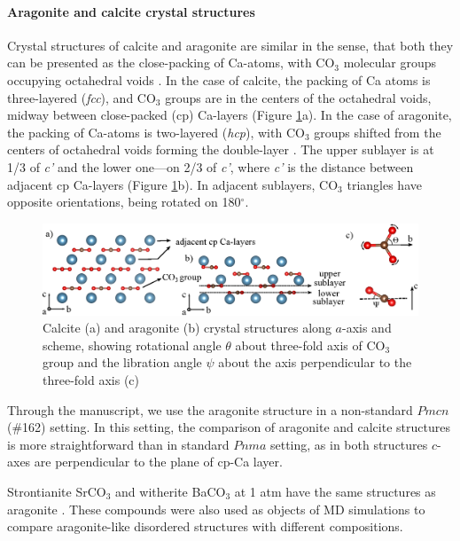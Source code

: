 \documentclass[journal=jacsat,manuscript=article]{achemso}
\begin{document}
	\paragraph{Aragonite and calcite crystal structures}
Crystal structures of calcite and aragonite are similar in the sense, that both they can be presented as the close-packing of Ca-atoms, with CO$_3$ molecular groups occupying octahedral voids \cite{bragg1924}.
In the case of calcite, the packing of Ca atoms is three-layered ({\it fcc}), and CO$_3$ groups are in the centers of the octahedral voids, midway between close-packed (cp) Ca-layers (Figure \ref{str}a).
 In the case of aragonite, the packing of Ca-atoms is two-layered ({\it hcp}), with CO$_3$ groups shifted from the centers of octahedral voids forming the double-layer \cite{bragg1924}. 
The upper sublayer is at 1/3 of {\it c'} and the lower one---on 2/3 of {\it c'}, where {\it c'} is the distance between adjacent cp Ca-layers (Figure \ref{str}b). 
In adjacent sublayers, CO$_3$ triangles have opposite orientations, being rotated on 180$^{\circ}$.

\begin{figure}[h]
	\includegraphics[width=\textwidth]{str}
	\caption{Calcite (a) and aragonite (b) crystal structures along $a$-axis and scheme, showing rotational angle  $\theta$ about three-fold axis of CO$_3$ group and the libration angle $\psi$ about the axis perpendicular to the three-fold axis (c)} \label{str}
\end{figure}


Through the manuscript, we use the aragonite structure in a non-standard $Pmcn$ (\#162) setting. 
In this setting, the comparison of aragonite and calcite structures is more straightforward than in standard $Pnma$ setting, as in both structures $c$-axes are perpendicular to the plane of cp-Ca layer.

Strontianite SrCO$_3$ and witherite BaCO$_3$ at 1 atm have the same structures as aragonite \cite{srco3}. 
These compounds were also used as objects of MD simulations to compare aragonite-like disordered structures with different compositions.


\end{document}
